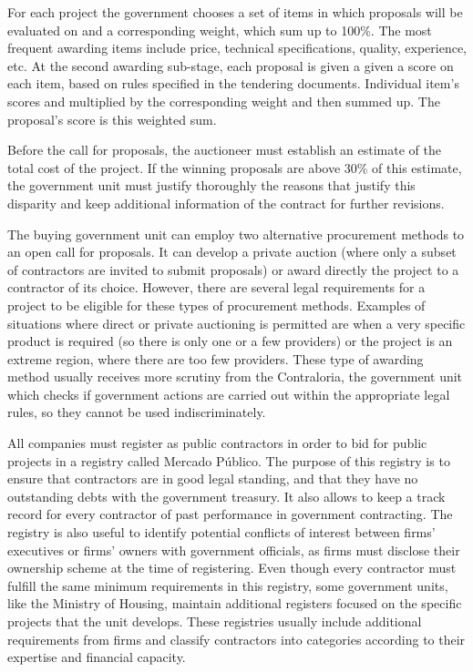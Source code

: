 For each project the government chooses a set of items in which proposals will be evaluated on and a corresponding weight, which sum up to 100\%. The most frequent awarding items include price, technical specifications, quality, experience, etc. At the second awarding sub-stage, each proposal is given a given a score on each item,  based on rules specified in the tendering documents. Individual item's scores and multiplied by the corresponding weight and then summed up. The proposal's score is this weighted sum.

Before the call for proposals, the auctioneer must establish an estimate of the total cost of the project. If the winning proposals are above 30\% of this estimate, the government unit must justify thoroughly the reasons that justify this disparity and keep additional information of the contract for further revisions.

The buying government unit can employ two alternative procurement methods to an open call for proposals. It can develop a private auction (where only a subset of contractors are invited to submit proposals) or award directly the project to a contractor of its choice. However, there are several legal requirements for a project to be eligible for these types of procurement methods. Examples of situations where direct or private auctioning is permitted are when a very specific product is required (so there is only one or a few providers) or the project is an extreme region, where there are too few providers. These type of awarding method usually receives more scrutiny from the Contraloria, the government unit which checks if government actions are carried out within the appropriate legal rules, so they cannot be used indiscriminately.

All companies must register as public contractors in order to bid for public projects in a registry called Mercado Público. The purpose of this registry is to ensure that contractors are in good legal standing, and that they have no outstanding debts with the government treasury. It also allows to keep a track record for every contractor of past performance in government contracting. The registry is also useful to identify potential conflicts of interest between firms' executives or firms' owners with government officials, as firms must disclose their ownership scheme at the time of registering. Even though every contractor must fulfill the same minimum requirements in this registry, some government units, like the Ministry of Housing, maintain additional registers focused on the specific projects that the unit develops. These registries usually include additional requirements from firms and classify contractors into categories according to their expertise and financial capacity.

